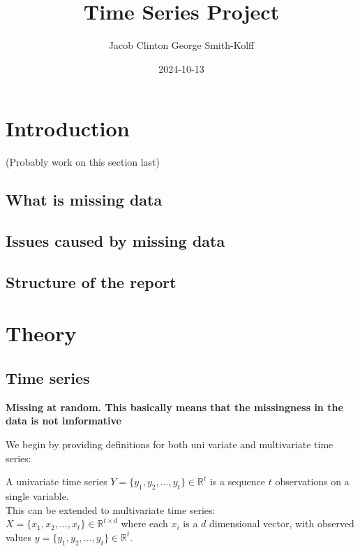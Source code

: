 \documentclass[
]{report}
\title{Time Series Project}
\author{Jacob Clinton George Smith-Kolff}
\date{2024-10-13}
\begin{document}
\maketitle

{
\setcounter{tocdepth}{1}
\tableofcontents
}
\hypertarget{introduction}{%
\chapter{Introduction}\label{introduction}}

(Probably work on this section last)

\hypertarget{what-is-missing-data}{%
\section{What is missing data}\label{what-is-missing-data}}

\hypertarget{issues-caused-by-missing-data}{%
\section{Issues caused by missing
data}\label{issues-caused-by-missing-data}}

\hypertarget{structure-of-the-report}{%
\section{Structure of the report}\label{structure-of-the-report}}

\hypertarget{theory}{%
\chapter{Theory}\label{theory}}

\hypertarget{time-series}{%
\section{Time series}\label{time-series}}

\textbf{Missing at random. This basically means that the missingness in the data is not imformative}

We begin by providing definitions for both uni variate and multivariate
time series:

A univariate time series \(Y = \{y_1, y_2, ..., y_t\} \in \mathbb{R}^t\)
is a sequence \(t\) observations on a single variable.\\
This can be extended to multivariate time series:\\
\(X = \{x_1, x_2, ..., x_t\}\in \mathbb{R}^{t\times d}\) where each
\(x_i\) is a \(d\) dimensional vector, with observed values
\(y = \{y_1, y_2, ..., y_t\} \in \mathbb{R}^t\).
\end{document}
